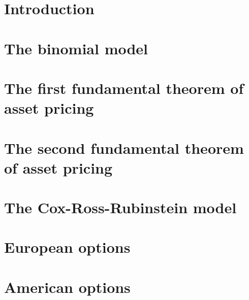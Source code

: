 \section{Introduction}
\label{sec:introduction}


\section{The binomial model}
\label{sec:binomial-model}


\section{The first fundamental theorem of asset pricing}
\label{sec:FToAP1}


\section{The second fundamental theorem of asset pricing}
\label{sec:FToAP2}


\section{The Cox-Ross-Rubinstein model}
\label{sec:cox-ross-rubinstein}


\section{European options}
\label{sec:european-options}


\section{American options}
\label{sec:american-options}


